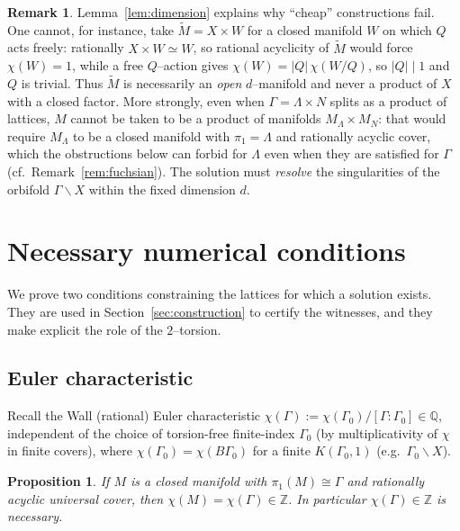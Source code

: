 \documentclass[12pt]{article}
\newcommand{\bQ}{\mathbb{Q}}
\newcommand{\bZ}{\mathbb{Z}}
\newtheorem{proposition}{Proposition}
\theoremstyle{definition}
\newtheorem{remark}{Remark}
\begin{document}
\begin{remark}\label{rem:noproduct}
Lemma~\ref{lem:dimension} explains why ``cheap'' constructions fail.  One cannot,
for instance, take $\widetilde M=X\times W$ for a closed manifold $W$ on which $Q$
acts freely: rationally $X\times W\simeq W$, so rational acyclicity of
$\widetilde M$ would force $\chi(W)=1$, while a free $Q$--action gives
$\chi(W)=|Q|\,\chi(W/Q)$, so $|Q|\mid1$ and $Q$ is trivial.  Thus
$\widetilde M$ is necessarily an \emph{open} $d$--manifold and never a product of
$X$ with a closed factor.  More strongly, even when $\Gamma=\Lambda\times N$
splits as a product of lattices, $M$ cannot be taken to be a product of manifolds
$M_\Lambda\times M_N$: that would require $M_\Lambda$ to be a closed manifold with
$\pi_1=\Lambda$ and rationally acyclic cover, which the obstructions below can
forbid for $\Lambda$ even when they are satisfied for $\Gamma$
(cf.\ Remark~\ref{rem:fuchsian}).  The solution must \emph{resolve} the
singularities of the orbifold $\Gamma\backslash X$ within the fixed dimension $d$.
\end{remark}

\section{Necessary numerical conditions}\label{sec:necessary}

We prove two conditions constraining the lattices for which a solution exists.
They are used in Section~\ref{sec:construction} to certify the witnesses, and they
make explicit the role of the $2$--torsion.

\subsection{Euler characteristic}

Recall the Wall (rational) Euler characteristic
$\chi(\Gamma):=\chi(\Gamma_0)/[\Gamma:\Gamma_0]\in\bQ$, independent of the choice
of torsion-free finite-index $\Gamma_0$ (by multiplicativity of $\chi$ in finite
covers), where $\chi(\Gamma_0)=\chi(B\Gamma_0)$ for a finite $K(\Gamma_0,1)$
(e.g.\ $\Gamma_0\backslash X$).

\begin{proposition}\label{prop:euler}
If $M$ is a closed manifold with $\pi_1(M)\cong\Gamma$ and rationally acyclic
universal cover, then $\chi(M)=\chi(\Gamma)\in\bZ$.  In particular
$\chi(\Gamma)\in\bZ$ is necessary.
\end{proposition}
\end{document}
